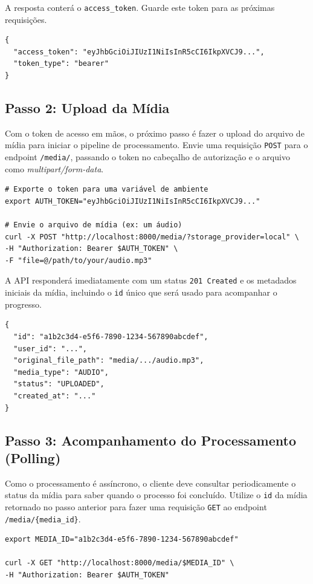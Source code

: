 A resposta conterá o \texttt{access\_token}. Guarde este token para as próximas requisições.

\begin{verbatim}
{
  "access_token": "eyJhbGciOiJIUzI1NiIsInR5cCI6IkpXVCJ9...",
  "token_type": "bearer"
}
\end{verbatim}

\subsection{Passo 2: Upload da Mídia}

Com o token de acesso em mãos, o próximo passo é fazer o upload do arquivo de mídia para iniciar o pipeline de processamento. Envie uma requisição \texttt{POST} para o endpoint \texttt{/media/}, passando o token no cabeçalho de autorização e o arquivo como \textit{multipart/form-data}.

\begin{verbatim}
# Exporte o token para uma variável de ambiente
export AUTH_TOKEN="eyJhbGciOiJIUzI1NiIsInR5cCI6IkpXVCJ9..."

# Envie o arquivo de mídia (ex: um áudio)
curl -X POST "http://localhost:8000/media/?storage_provider=local" \
-H "Authorization: Bearer $AUTH_TOKEN" \
-F "file=@/path/to/your/audio.mp3"
\end{verbatim}

A API responderá imediatamente com um status \texttt{201 Created} e os metadados iniciais da mídia, incluindo o \texttt{id} único que será usado para acompanhar o progresso.

\begin{verbatim}
{
  "id": "a1b2c3d4-e5f6-7890-1234-567890abcdef",
  "user_id": "...",
  "original_file_path": "media/.../audio.mp3",
  "media_type": "AUDIO",
  "status": "UPLOADED",
  "created_at": "..."
}
\end{verbatim}

\subsection{Passo 3: Acompanhamento do Processamento (Polling)}

Como o processamento é assíncrono, o cliente deve consultar periodicamente o status da mídia para saber quando o processo foi concluído. Utilize o \texttt{id} da mídia retornado no passo anterior para fazer uma requisição \texttt{GET} ao endpoint \texttt{/media/\{media\_id\}}.

\begin{verbatim}
export MEDIA_ID="a1b2c3d4-e5f6-7890-1234-567890abcdef"

curl -X GET "http://localhost:8000/media/$MEDIA_ID" \
-H "Authorization: Bearer $AUTH_TOKEN"
\end{verbatim}

